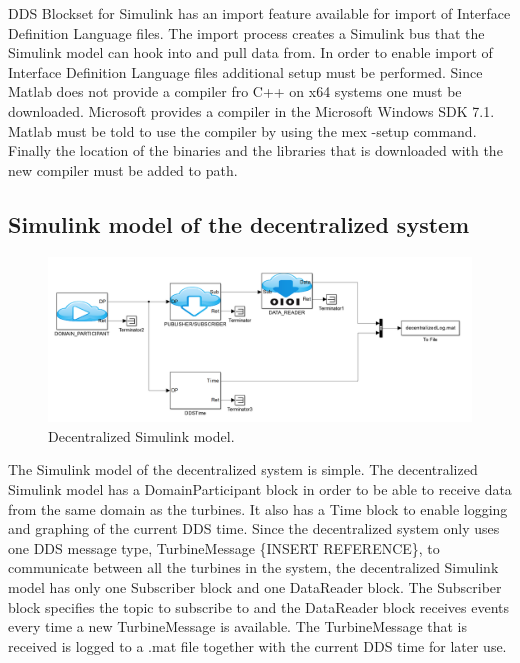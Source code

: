 DDS Blockset for Simulink has an import feature available for import of Interface Definition Language files. The import process creates a Simulink bus that the Simulink model can hook into and pull data from. In order to enable import of Interface Definition Language files additional setup must be performed.
Since Matlab does not provide a compiler fro C++ on x64 systems one must be downloaded. Microsoft provides a compiler in the Microsoft Windows SDK 7.1. Matlab must be told to use the compiler by using the mex -setup command. Finally the location of the binaries and the libraries that is downloaded with the new compiler must be added to path.

\subsection{Simulink model of the decentralized system}\label{subsec:decentralizedmodel}

\begin{figure}[b]
\includegraphics[width=\textwidth]{figures/DecentralizedModel}
	\caption[Decentralized Simulink model]{
		\label{fig:decentralizedSimulinkModel} 
		\footnotesize{%
			Decentralized Simulink model.
		}
	}
\end{figure}

The Simulink model of the decentralized system is simple. The decentralized Simulink model has a DomainParticipant block in order to be able to receive data from the same domain as the turbines. It also has a Time block to enable logging and graphing of the current DDS time. Since the decentralized system only uses one DDS message type, TurbineMessage \{INSERT REFERENCE\}, to communicate between all the turbines in the system, the decentralized Simulink model has only one Subscriber block and one DataReader block. The Subscriber block specifies the topic to subscribe to and the DataReader block receives events every time a new TurbineMessage is available. The TurbineMessage that is received is logged to a .mat file together with the current DDS time for later use.


